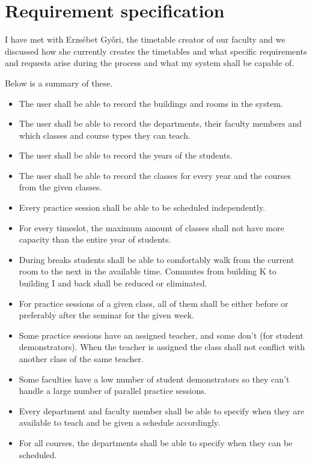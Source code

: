 \chapter{Requirement specification}

I have met with Erzsébet Győri, the timetable creator of our faculty and we discussed how she currently creates the timetables and what specific requirements and requests arise during the process and what my system shall be capable of.

Below is a summary of these.

\begin{itemize}

\item The user shall be able to record the buildings and rooms in the system.
\item The user shall be able to record the departments, their faculty members and which classes and course types they can teach.
\item The user shall be able to record the years of the students.
\item The user shall be able to record the classes for every year and the courses from the given classes.
\item Every practice session shall be able to be scheduled independently.
\item For every timeslot, the maximum amount of classes shall not have more capacity than the entire year of students.
\item During breaks students shall be able to comfortably walk from the current room to the next in the available time. Commutes from building K to building I and back shall be reduced or eliminated.
\item For practice sessions of a given class, all of them shall be either before or preferably after the seminar for the given week.  
\item Some practice sessions have an assigned teacher, and some don't (for student demonstrators). When the teacher is assigned the class shall not conflict with another class of the same teacher.
\item Some faculties have a low number of student demonstrators so they can't handle a large number of parallel practice sessions.  
\item Every department and faculty member shall be able to specify when they are available to teach and be given a schedule accordingly.
\item For all courses, the departments shall be able to specify when they can be scheduled.

\end{itemize}
